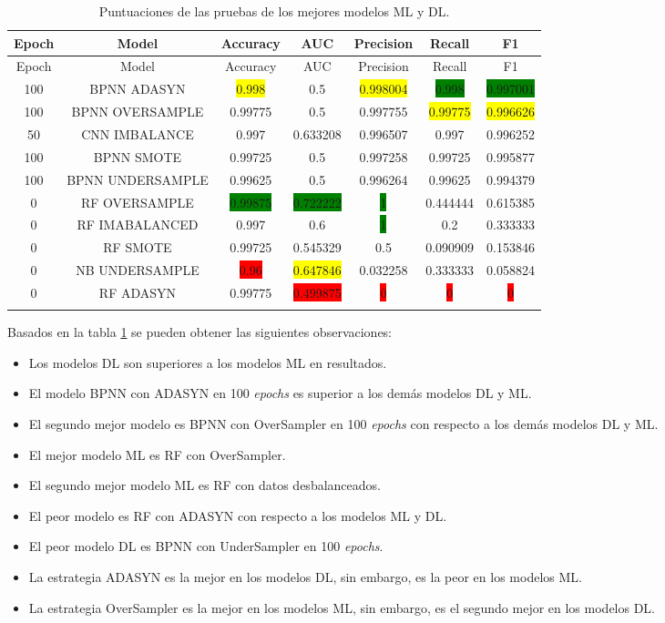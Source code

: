   \begin{longtable}{|c|c|c|c|c|c|c|}
  	\hline
  	Epoch & Model & Accuracy & AUC & Precision & Recall & F1\\ \hline
  	\endfirsthead
  	\hline
  	Epoch & Model & Accuracy & AUC & Precision & Recall & F1\\ \hline
  	\endhead
  	100 & BPNN ADASYN & \colorbox{yellow}{0.998} & 0.5 & \colorbox{yellow}{0.998004} & \colorbox{green}{0.998} & \colorbox{green}{0.997001}\\ \hline
  	100 & BPNN OVERSAMPLE & 0.99775 & 0.5 & 0.997755 & \colorbox{yellow}{0.99775} & \colorbox{yellow}{0.996626}\\ \hline
  	50 & CNN IMBALANCE & 0.997 & 0.633208 & 0.996507 & 0.997 & 0.996252\\ \hline
  	100 & BPNN SMOTE & 0.99725 & 0.5 & 0.997258 & 0.99725 & 0.995877\\ \hline
  	100 & BPNN UNDERSAMPLE & 0.99625 & 0.5 & 0.996264 & 0.99625 & 0.994379\\ \hline
  	0 & RF OVERSAMPLE & \colorbox{green}{0.99875} & \colorbox{green}{0.722222} & \colorbox{green}{1} & 0.444444 & 0.615385\\ \hline
  	0 & RF IMABALANCED & 0.997 & 0.6 & \colorbox{green}{1} & 0.2 & 0.333333\\ \hline
  	0 & RF SMOTE & 0.99725 & 0.545329 & 0.5 & 0.090909 & 0.153846\\ \hline
  	0 & NB UNDERSAMPLE & \colorbox{red}{0.96} & \colorbox{yellow}{0.647846} & 0.032258 & 0.333333 & 0.058824\\ \hline
  	0 & RF ADASYN & 0.99775 & \colorbox{red}{0.499875} & \colorbox{red}{0} & \colorbox{red}{0} & \colorbox{red}{0}\\ \hline
  	\caption{Puntuaciones de las pruebas de los mejores modelos ML y DL.}
  	\label{t:24}
  \end{longtable}

Basados en la tabla \ref{t:24} se pueden obtener las siguientes observaciones:
\begin{itemize}
	\item Los modelos DL son superiores a los modelos ML en resultados.
	\item El modelo BPNN con ADASYN en 100 \textit{epochs} es superior a los dem\'{a}s modelos DL y ML.
	\item El segundo mejor modelo es BPNN con OverSampler en 100 \textit{epochs} con respecto a los dem\'{a}s modelos DL y ML.
	\item El mejor modelo ML es RF con OverSampler.
	\item El segundo mejor modelo ML es RF con datos desbalanceados.
	\item El peor modelo es RF con ADASYN con respecto a los modelos ML y DL.
	\item El peor modelo DL es BPNN con UnderSampler en 100 \textit{epochs}.
	\item La estrategia ADASYN es la mejor en los modelos DL, sin embargo, es la peor en los modelos ML.
	\item La estrategia OverSampler es la mejor en los modelos ML, sin embargo, es el segundo mejor en los modelos DL.
\end{itemize}

